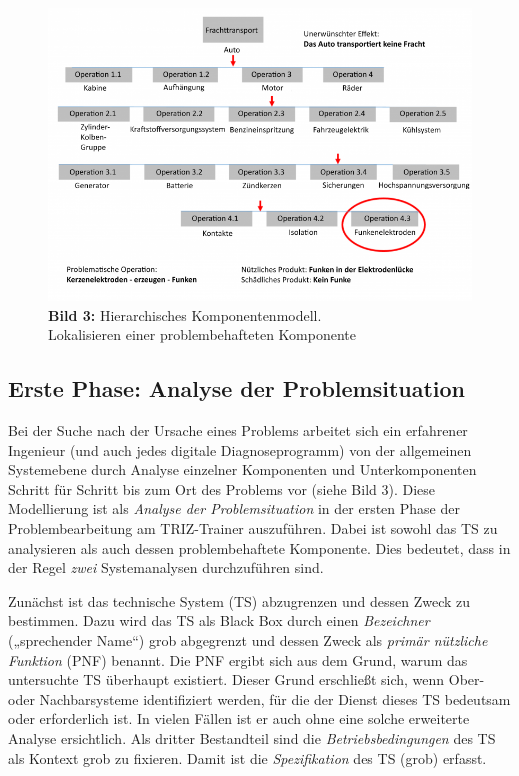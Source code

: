 \documentclass[11pt,a4paper]{article}
\begin{document}
\begin{figure}[ht]\centering
  \includegraphics[width=.9\textwidth]{1212_xxl.png}\\[4pt]
  \textbf{Bild 3:} Hierarchisches Komponentenmodell.\\ Lokalisieren einer
  problembehafteten Komponente
\end{figure}

\subsection{Erste Phase: Analyse der Problemsituation}

Bei der Suche nach der Ursache eines Problems arbeitet sich ein erfahrener
Ingenieur (und auch jedes digitale Diagnoseprogramm) von der allgemeinen
Systemebene durch Analyse einzelner Komponenten und Unterkomponenten Schritt
für Schritt bis zum Ort des Problems vor (siehe Bild 3).  Diese Modellierung
ist als \emph{Analyse der Problemsituation} in der ersten Phase der
Problembearbeitung am TRIZ-Trainer auszuführen.  Dabei ist sowohl das TS zu
analysieren als auch dessen problembehaftete Komponente.  Dies bedeutet, dass
in der Regel \emph{zwei} Systemanalysen durchzuführen sind.

Zunächst ist das technische System (TS) abzugrenzen und dessen Zweck zu
bestimmen. Dazu wird das TS als Black Box durch einen \emph{Bezeichner}
(„sprechender Name“) grob abgegrenzt und dessen Zweck als \emph{primär
  nützliche Funktion} (PNF) benannt.  Die PNF ergibt sich aus dem Grund, warum
das untersuchte TS überhaupt existiert.  Dieser Grund erschließt sich, wenn
Ober- oder Nachbarsysteme identifiziert werden, für die der Dienst dieses TS
bedeutsam oder erforderlich ist.  In vielen Fällen ist er auch ohne eine
solche erweiterte Analyse ersichtlich.  Als dritter Bestandteil sind die
\emph{Betriebsbedingungen} des TS als Kontext grob zu fixieren.  Damit ist die
\emph{Spezifikation} des TS (grob) erfasst.
\end{document}
